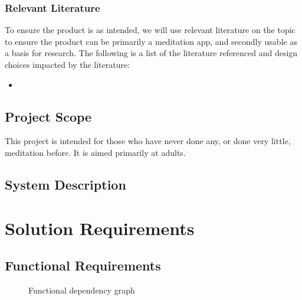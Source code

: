 \documentclass[coverpage]{../custom}
\begin{document}
\subsubsection{Relevant Literature}

To ensure the product is as intended, we will use relevant literature on the topic to ensure the product can be primarily a meditation app, and secondly usable as a basis for research. The following is a list of the literature referenced and design choices impacted by the literature:
\begin{itemize}
	\item 
\end{itemize}

\subsection{Project Scope}
\label{ssec:scope}

This project is intended for those who have never done any, or done very little, meditation before. It is aimed primarily at adults. 

\subsection{System Description}
\label{ssec:desc}

\section{Solution Requirements}
\label{sec:req}

\subsection{Functional Requirements}
\label{ssec:f_req}

\begin{figure}[h!]
	\centering
	\caption{Functional dependency graph}
\end{figure}
\end{document}
